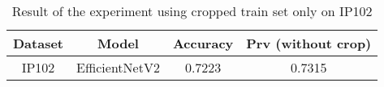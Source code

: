 \begin{table}[!htbp]
\centering
\begin{tabular}{|c|c|c|c|}
\hline
\textbf{Dataset} & \textbf{Model} & \textbf{Accuracy} & \textbf{Prv (without crop)}\\
\hline
IP102 & EfficientNetV2 & 0.7223 & 0.7315\\
\hline
\end{tabular}
\caption{Result of the experiment using cropped train set only on IP102}
\end{table}

